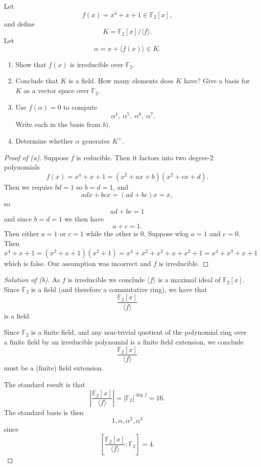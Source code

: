 \begin{prob}
    Let 
    \[
        f(x) = x^4 + x + 1 \in \mathbb F_2[x],
    \]
    and define 
    \[
        K = \mathbb F_2[x]/\langle f \rangle.
    \]
    Let 
    \[
        \alpha = x + \langle f(x) \rangle \in K.
    \]

    \begin{enumerate}[label=\alph*)]
        \item Show that $f(x)$ is irreducible over 
            $\mathbb F_2$.
        \item Conclude that $K$ is a field. How many elements does 
            $K$ have? 
            Give a basis for $K$ as a vector space over 
            $\mathbb F_2$.
        \item Use $f(\alpha) = 0$ to compute 
            \[
                \alpha^4, \ \alpha^5, 
                \ \alpha^6, \ \alpha^7.
            \]
            Write each in the basis from $b)$.
        \item Determine whether $\alpha$ generates 
            $K^\times$.
    \end{enumerate}
\end{prob}
\begin{proof}[Proof of (a)]
    Suppose $f$ is reducible. Then it factors into two 
    degree-$2$ polynomials 
    \[
        f(x) = x^4 + x + 1 = (x^2 + ax + b)(x^2 + cx + d).
    \]
    Then we require $bd = 1$ so $b = d = 1$, and 
    \[
        adx + bcx = (ad + bc)x = x, 
    \]
    so 
    \[
        ad + bc = 1
    \]
    and since $b = d = 1$ we then have 
    \[
        a + c = 1.
    \]
    Then either $a=1$ or $c = 1$ while the other 
    is $0$. Suppose wlog $a = 1$ and $c = 0$. Then 
    \[
        x^4 + x + 1 = (x^2 + x + 1)(x^2 + 1) 
        = x^4 + x^2 + x^3 + x + x^2 + 1 
        = x^4 + x^3 + x + 1
    \]
    which is false. Our assumption was incorrect and 
    $f$ is irreducible. 
\end{proof}
\begin{proof}[Solution of (b)]
    As $f$ is irreducible we conclude 
    $\langle f \rangle$ is a maximal ideal of 
    $\mathbb F_2[x]$. Since $\mathbb F_2$ is a field 
    (and therefore a commutative ring), we have that 
    \[
        \frac{\mathbb F_2[x]}{\langle f \rangle} 
    \]
    is a field. 
    
    Since $\mathbb F_2$ is a finite field, and any 
    non-trivial quotient of the polynomial ring over a finite 
    field by an irreducible polynomial is a finite field 
    extension, we conclude 
    \[
        \frac{\mathbb F_2[x]}{\langle f \rangle} 
    \]
    must be a (finite) field extension.

    The standard result is that 
    \[
        \left| \frac{\mathbb F_2[x]}{\langle f \rangle} \right| 
        = |\mathbb F_2|^{\deg f} 
        = 16.
    \]
    The standard basis is then 
    \[
        1, \alpha, \alpha^2, \alpha^3
    \]
    since 
    \[
        \left[\frac{\mathbb F_2[x]}{\langle f \rangle} : \mathbb F_2
            \right] 
        = 4.
    \]
\end{proof}
